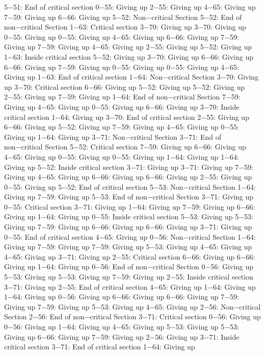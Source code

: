 5−51: End of critical section
0−55: Giving up
2−55: Giving up
4−65: Giving up
7−59: Giving up
6−66: Giving up
5−52: Non−critical Section
5−52: End of non−critical Section
1−63: Critical section
3−70: Giving up
3−70: Giving up
0−55: Giving up
0−55: Giving up
4−65: Giving up
6−66: Giving up
7−59: Giving up
7−59: Giving up
4−65: Giving up
2−55: Giving up
5−52: Giving up
1−63: Inside critical section
5−52: Giving up
3−70: Giving up
6−66: Giving up
6−66: Giving up
7−59: Giving up
0−55: Giving up
0−55: Giving up
4−65: Giving up
1−63: End of critical section
1−64: Non−critical Section
3−70: Giving up
3−70: Critical section
6−66: Giving up
5−52: Giving up
5−52: Giving up
2−55: Giving up
7−59: Giving up
1−64: End of non−critical Section
7−59: Giving up
4−65: Giving up
0−55: Giving up
6−66: Giving up
3−70: Inside critical section
1−64: Giving up
3−70: End of critical section
2−55: Giving up
6−66: Giving up
5−52: Giving up
7−59: Giving up
4−65: Giving up
0−55: Giving up
1−64: Giving up
3−71: Non−critical Section
3−71: End of non−critical Section
5−52: Critical section
7−59: Giving up
6−66: Giving up
4−65: Giving up
0−55: Giving up
0−55: Giving up
1−64: Giving up
1−64: Giving up
5−52: Inside critical section
3−71: Giving up
3−71: Giving up
7−59: Giving up
4−65: Giving up
6−66: Giving up
6−66: Giving up
2−55: Giving up
0−55: Giving up
5−52: End of critical section
5−53: Non−critical Section
1−64: Giving up
7−59: Giving up
5−53: End of non−critical Section
3−71: Giving up
0−55: Critical section
3−71: Giving up
1−64: Giving up
7−59: Giving up
6−66: Giving up
1−64: Giving up
0−55: Inside critical section
5−53: Giving up
5−53: Giving up
7−59: Giving up
6−66: Giving up
6−66: Giving up
3−71: Giving up
0−55: End of critical section
4−65: Giving up
0−56: Non−critical Section
1−64: Giving up
7−59: Giving up
7−59: Giving up
5−53: Giving up
4−65: Giving up
4−65: Giving up
3−71: Giving up
2−55: Critical section
6−66: Giving up
6−66: Giving up
1−64: Giving up
0−56: End of non−critical Section
0−56: Giving up
5−53: Giving up
5−53: Giving up
7−59: Giving up
2−55: Inside critical section
3−71: Giving up
2−55: End of critical section
4−65: Giving up
1−64: Giving up
1−64: Giving up
0−56: Giving up
6−66: Giving up
6−66: Giving up
7−59: Giving up
7−59: Giving up
5−53: Giving up
4−65: Giving up
2−56: Non−critical Section
2−56: End of non−critical Section
3−71: Critical section
0−56: Giving up
0−56: Giving up
1−64: Giving up
4−65: Giving up
5−53: Giving up
5−53: Giving up
6−66: Giving up
7−59: Giving up
2−56: Giving up
3−71: Inside critical section
3−71: End of critical section
1−64: Giving up
